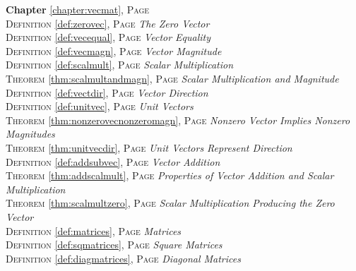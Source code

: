 \begin{multicols}{2}
      \setlength{\parindent}{0pt}
      \footnotesize{
         \textbf{Chapter} \ref{chapter:vecmat}, \textsc{Page} \pageref{chapter:vecmat} \\
         \textsc{Definition} \ref{def:zerovec}, \textsc{Page} \pageref{def:zerovec} \textit{The Zero Vector} \\
         \textsc{Definition} \ref{def:vecequal}, \textsc{Page} \pageref{def:vecequal} \textit{Vector Equality} \\
         \textsc{Definition} \ref{def:vecmagn}, \textsc{Page} \pageref{def:vecmagn} \textit{Vector Magnitude} \\
         \textsc{Definition} \ref{def:scalmult}, \textsc{Page} \pageref{def:scalmult} \textit{Scalar Multiplication} \\
         \textsc{Theorem} \ref{thm:scalmultandmagn}, \textsc{Page} \pageref{thm:scalmultandmagn} \textit{Scalar Multiplication and Magnitude} \\
         \textsc{Definition} \ref{def:vectdir}, \textsc{Page} \pageref{def:vectdir} \textit{Vector Direction} \\
         \textsc{Definition} \ref{def:unitvec}, \textsc{Page} \pageref{def:unitvec} \textit{Unit Vectors} \\
         \textsc{Theorem} \ref{thm:nonzerovecnonzeromagn}, \textsc{Page} \pageref{thm:nonzerovecnonzeromagn} \textit{Nonzero Vector Implies Nonzero Magnitudes} \\
         \textsc{Theorem} \ref{thm:unitvecdir}, \textsc{Page} \pageref{thm:unitvecdir} \textit{Unit Vectors Represent Direction} \\
         \textsc{Definition} \ref{def:addsubvec}, \textsc{Page} \pageref{def:addsubvec} \textit{Vector Addition} \\
         \textsc{Theorem} \ref{thm:addscalmult}, \textsc{Page} \pageref{thm:addscalmult} \textit{Properties of Vector Addition and Scalar Multiplication} \\
         \textsc{Theorem} \ref{thm:scalmultzero}, \textsc{Page} \pageref{thm:scalmultzero} \textit{Scalar Multiplication Producing the Zero Vector} \\
         \textsc{Definition} \ref{def:matrices}, \textsc{Page} \pageref{def:matrices} \textit{Matrices} \\
         \textsc{Definition} \ref{def:sqmatrices}, \textsc{Page} \pageref{def:sqmatrices} \textit{Square Matrices} \\
         \textsc{Definition} \ref{def:diagmatrices}, \textsc{Page} \pageref{def:diagmatrices} \textit{Diagonal Matrices} \\
}
\end{multicols}
